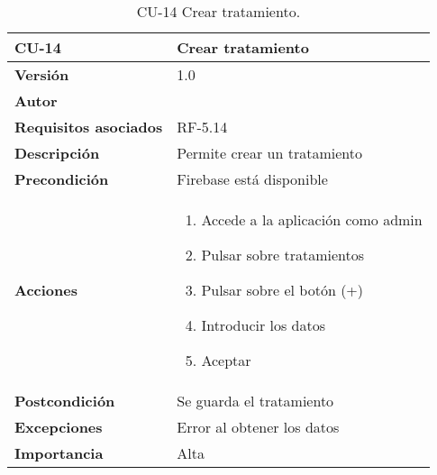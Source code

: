 \begin{table}[p]
	\centering
	\begin{tabularx}{\linewidth}{ p{} p{} }
		\toprule
		\textbf{CU-14}    & \textbf{Crear tratamiento}\\
		\toprule
		\textbf{Versión}              & 1.0    \\
		\textbf{Autor}                & {\nombre} \\
		\textbf{Requisitos asociados} & RF-5.14 \\
		\textbf{Descripción}          & Permite crear un tratamiento \\
		\textbf{Precondición}         & Firebase está disponible \\
		\textbf{Acciones}             &
		\begin{enumerate}
			\def\labelenumi{\arabic{enumi}.}
			\tightlist
			\item Accede a la aplicación como admin
			\item Pulsar sobre tratamientos
			\item Pulsar sobre el botón (+)
			\item Introducir los datos
			\item Aceptar
		\end{enumerate}\\
		\textbf{Postcondición}        & Se guarda el tratamiento\\
		\textbf{Excepciones}          & Error al obtener los datos \\
		\textbf{Importancia}          & Alta \\
		\bottomrule
	\end{tabularx}
	\caption{CU-14 Crear tratamiento.}
\end{table}

